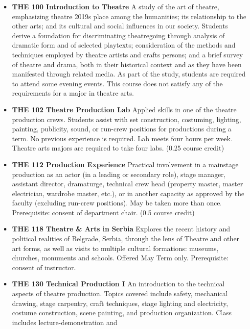 \documentclass[
  letterpaper,
]{scrbook}
\providecommand{\tightlist}{%
  \setlength{\itemsep}{0pt}\setlength{\parskip}{0pt}}
\begin{document}
\begin{itemize}
\tightlist
\item
  \textbf{THE 100 Introduction to Theatre} A study of the art of
  theatre, emphasizing theatre 2019s place among the humanities; its
  relationship to the other arts; and its cultural and social influences
  in our society. Students derive a foundation for discriminating
  theatregoing through analysis of dramatic form and of selected
  playtexts; consideration of the methods and techniques employed by
  theatre artists and crafts persons; and a brief survey of theatre and
  drama, both in their historical context and as they have been
  manifested through related media. As part of the study, students are
  required to attend some evening events. This course does not satisfy
  any of the requirements for a major in theatre arts.\\
\item
  \textbf{THE 102 Theatre Production Lab} Applied skills in one of the
  theatre production crews. Students assist with set construction,
  costuming, lighting, painting, publicity, sound, or run-crew positions
  for productions during a term. No previous experience is required. Lab
  meets four hours per week. Theatre arts majors are required to take
  four labs. (0.25 course credit)
\item
  \textbf{THE 112 Production Experience} Practical involvement in a
  mainstage production as an actor (in a leading or secondary role),
  stage manager, assistant director, dramaturge, technical crew head
  (property master, master electrician, wardrobe master, etc.), or in
  another capacity as approved by the faculty (excluding run-crew
  positions). May be taken more than once. Prerequisite: consent of
  department chair. (0.5 course credit)\\
\item
  \textbf{THE 118 Theatre \& Arts in Serbia} Explores the recent history
  and political realities of Belgrade, Serbia, through the lens of
  Theatre and other art forms, as well as visits to multiple cultural
  formations: museums, churches, monuments and schools. Offered May Term
  only. Prerequisite: consent of instructor.
\item
  \textbf{THE 130 Technical Production I} An introduction to the
  technical aspects of theatre production. Topics covered include
  safety, mechanical drawing, stage carpentry, craft techniques, stage
  lighting and electricity, costume construction, scene painting, and
  production organization. Class includes lecture-demonstration and

\end{itemize}
\end{document}
